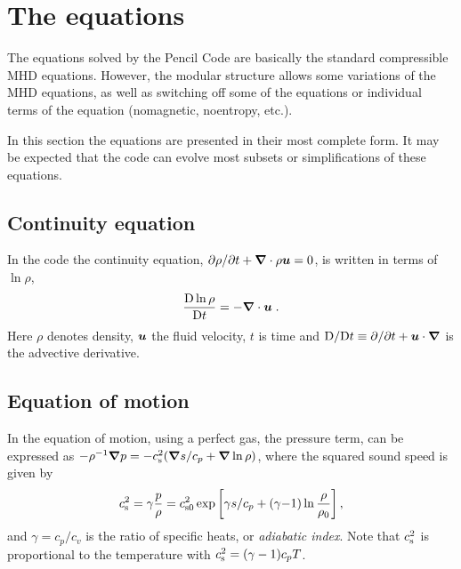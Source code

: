 \documentclass[\mydriver,12pt,twoside,notitlepage,a4paper]{article}
\newcommand{\De}      {\mathrm{D}}
\renewcommand{\vec}[1]{\mbox{\boldmath{$#1$}}}
\newcommand{\grad}    {\vec{\nabla}}
\newcommand{\Div}     {\vec{\nabla}\cdot}
\newcommand{\uv}            {\vec{u}}
\newcommand{\cs}            {c_{\rm s}}
\begin{document}

\section{The equations}

The equations solved by the {\sc Pencil Code} are basically the standard
compressible MHD equations. However, the modular structure allows
some variations of the MHD equations, as well as switching off
some of the equations or individual terms of the equation (nomagnetic,
noentropy, etc.).

In this section the equations are presented in their most complete form.
It may be expected that the code can evolve most subsets or
simplifications of these equations.


\subsection{Continuity equation}

In the code the continuity equation,
$\partial\rho/\partial t+\Div\rho\uv=0$,
is written in terms of $\ln\rho$,
\begin{equation}
  \frac{\De\ln\rho}{\De t}
  = - \Div\uv \; .
\end{equation}
Here $\rho$ denotes density, $\uv$ the fluid velocity, $t$ is time and
$\De/\De t \equiv \partial/\partial t + \uv\cdot\grad$ is the advective
derivative.


\subsection{Equation of motion}
\label{S-Eqn-of-motion}

In the equation of motion, using a perfect gas, the pressure term,
can be expressed as
$-\rho^{-1}\grad p = -\cs^2(\grad s/c_p+\grad\ln\rho)$,
where the squared sound speed is given by
\begin{equation}
  \cs^2 = \gamma \frac{p}{\rho}
        = c_{\rm s0}^2\exp\left[\gamma s/c_p
                                + (\gamma{-}1)\ln\frac{\rho}{\rho_0}
                               \right],
\label{EOSsimple}
\end{equation}
and $\gamma=c_p/c_v$ is the ratio of specific heats, or \emph{adiabatic index}.
Note that $\cs^2$ is proportional to the temperature with
$\cs^2=(\gamma-1)c_p T$.
\end{document}
